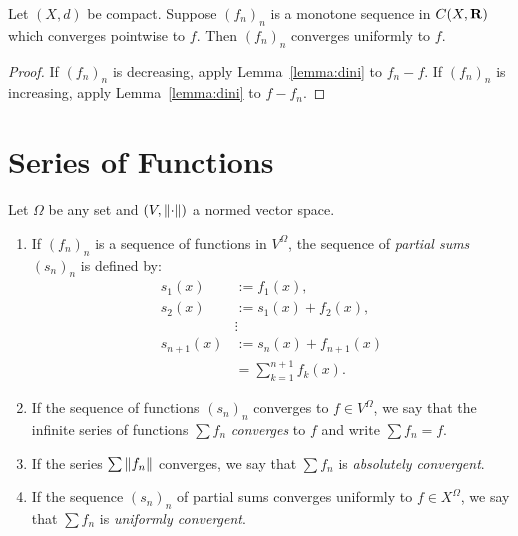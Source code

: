 \documentclass[11pt,twoside,openany]{memoir}
\begin{document}
    \begin{theorem}
        Let $(X,d)$ be compact. Suppose $(f_n)_n$ is a monotone sequence in $C(X,\mathbf{R})$ which converges pointwise to $f$. Then $(f_n)_n$ converges uniformly to $f$.
    \end{theorem}
        \begin{proof}
            If $(f_n)_n$ is decreasing, apply Lemma~\ref{lemma:dini} to $f_n - f$. If $(f_n)_n$ is increasing, apply Lemma~\ref{lemma:dini} to $f - f_n$.
        \end{proof}

\section*{Series of Functions}
    \begin{definition}
        Let $\Omega$ be any set and $(V,\left\lVert \cdot \right\rVert)$ a normed vector space.
        \begin{enumerate}[label = (\arabic*),itemsep=1pt,topsep=3pt]
            \item If $(f_n)_n$ is a sequence of functions in $V^\Omega$, the sequence of \textit{partial sums} $(s_n)_n$ is defined by:
                \begin{equation*}
                \begin{split}
                    s_1(x) &:= f_1(x), \\
                    s_2(x) &:= s_1(x) + f_2(x), \\
                    &\vdots \\
                    s_{n+1}(x) &:= s_n(x) + f_{n+1}(x) \\
                    & = \sum_{k = 1}^{n+1}f_k(x).
                \end{split}
                \end{equation*}
            

            \item If the sequence of functions $(s_n)_n$ converges to $f \in V^\Omega$, we say that the infinite series of functions $\sum f_n$ \textit{converges} to $f$ and write $\sum f_n = f$.
            
            \item If the series $\sum \left\lVert f_n \right\rVert$ converges, we say that $\sum f_n$ is \textit{absolutely convergent}.
            \item If the sequence $(s_n)_n$ of partial sums converges uniformly to $f \in X^\Omega$, we say that $\sum f_n$ is \textit{uniformly convergent}.
        \end{enumerate}
    \end{definition}
\end{document}
